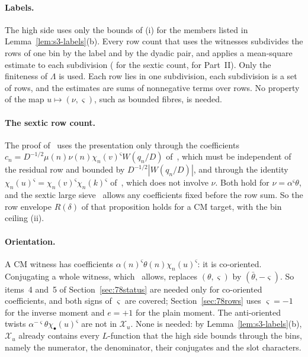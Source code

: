 \documentclass[11pt]{article}
\numberwithin{equation}{section}
\begin{document}
\paragraph{Labels.} The high side uses only the bounds of (i) for the members listed in
Lemma~\ref{lem:s3-labels}(b). Every row count that uses the witnesses subdivides the rows of one bin by
the label and by the dyadic pair, and applies a mean-square estimate to each subdivision
(\cite[proof of Proposition~9.2]{OAI78} for the sextic count, \cite[proof of Proposition~19.2]{OAI78} for Part~II). Only the
finiteness of $\Lambda$ is used. Each row lies in one subdivision, each subdivision is a set of rows,
and the estimates are sums of nonnegative terms over rows. No property of the map
$u\mapsto(\nu,\varsigma)$, such as bounded fibres, is needed.

\paragraph{The sextic row count.} The proof of~\cite[Prop.~9.2]{OAI78} uses the
presentation only through the coefficients
$c_n=D^{-1/2}\mu(n)\nu(n)\chi_n(v)^\varsigma W(q_n/D)$ of~\cite[proof of Proposition~9.2]{OAI78}, which must be
independent of the residual row and bounded by $D^{-1/2}|W(q_n/D)|$, and through the identity
$\chi_n(u)^\varsigma=\chi_n(v)^\varsigma\chi_n(k)^\varsigma$ of~\cite[eq.~(9.20)]{OAI78}, which
does not involve $\nu$. Both hold for $\nu=\alpha^\varsigma\theta$, and the sextic large
sieve~\cite[Lemma~9.1]{OAI78} allows any coefficients fixed before the row sum. So the
row envelope $R(\delta)$ of that proposition holds for a CM target, with the bin ceiling (ii).

\paragraph{Orientation.} A CM witness has coefficients $\alpha(n)^\varsigma\theta(n)\chi_n(u)^\varsigma$: it is
co-oriented. Conjugating a whole witness, which~\cite[Section~4.1]{OAI78} allows, replaces
$(\theta,\varsigma)$ by $(\bar\theta,-\varsigma)$. So items~4 and~5 of Section~\ref{sec:78status} are needed
only for co-oriented coefficients, and both signs of $\varsigma$ are covered; Section~\ref{sec:78rows} uses
$\varsigma=-1$ for the inverse moment and $e=+1$ for the plain moment. The anti-oriented twists
$\alpha^{-\varsigma}\theta\chi_\bullet(u)^\varsigma$ are not in $\mathcal X_u$. None is needed: by
Lemma~\ref{lem:s3-labels}(b), $\mathcal X_u$ already contains every $L$-function that the high side bounds
through the bins, namely the numerator, the denominator, their conjugates and the slot characters.
\end{document}
